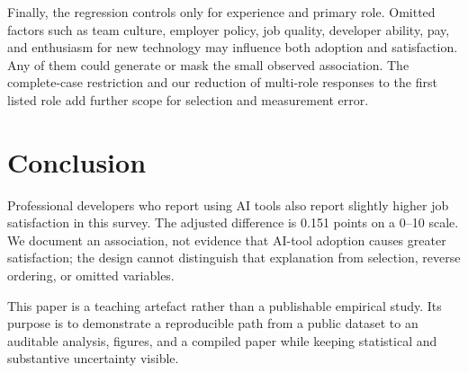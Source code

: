 \documentclass[11pt]{article}
\begin{document}
Finally, the regression controls only for experience and primary role. Omitted
factors such as team culture, employer policy, job quality, developer ability,
pay, and enthusiasm for new technology may influence both adoption and
satisfaction. Any of them could generate or mask the small observed association.
The complete-case restriction and our reduction of multi-role responses to the
first listed role add further scope for selection and measurement error.

\section{Conclusion}
Professional developers who report using AI tools also report slightly higher
job satisfaction in this survey. The adjusted difference is 0.151 points on a
0--10 scale. We document an association, not evidence that AI-tool adoption
causes greater satisfaction; the design cannot distinguish that explanation
from selection, reverse ordering, or omitted variables.

This paper is a teaching artefact rather than a publishable empirical study. Its
purpose is to demonstrate a reproducible path from a public dataset to an
auditable analysis, figures, and a compiled paper while keeping statistical and
substantive uncertainty visible.



\end{document}
